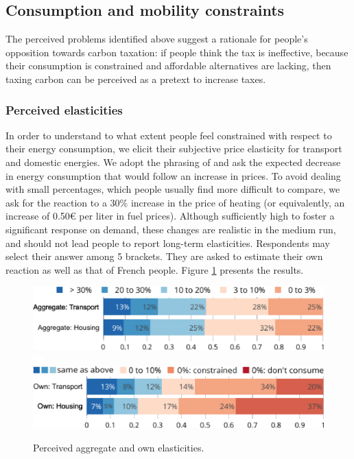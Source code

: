 \documentclass[english,5p,authoryear]{elsarticle}
\begin{document}
    \subsection{Consumption and mobility constraints}

The perceived problems identified above suggest a rationale for people's opposition towards carbon taxation: if people think the tax is ineffective, because their consumption is constrained and affordable alternatives are lacking, then taxing carbon can be perceived as a pretext to increase taxes. %

    \subsubsection{Perceived elasticities}

In order to understand to what extent people feel constrained with respect to their energy consumption, we elicit their subjective price elasticity for transport and domestic energies. We adopt the phrasing of \citet{baranzini_effectiveness_2017} and ask the expected decrease in energy consumption that would follow an increase in prices. To avoid dealing with small percentages, which people usually find more difficult to compare, we ask for the reaction to a 30\% increase in the price of heating (or equivalently, an increase of 0.50\euro{} per liter in fuel prices). Although sufficiently high to foster a significant response on demand, these changes are realistic in the medium run, and should not lead people to report long-term elasticities. Respondents may select their answer among 5 brackets. They are asked to estimate their own reaction as well as that of French people. Figure \ref{fig:elasticities_agg} presents the results.


\begin{figure}[t]
\centering
\includegraphics[width=\columnwidth]{Images_EPS/elasticities_agg_valb.eps}
\includegraphics[height=0.3cm]{Images_EPS/blank.eps}
\includegraphics[width=\columnwidth]{Images_EPS/elasticities_perso_valbuena.eps}
\caption{Perceived aggregate and own elasticities.}
\label{fig:elasticities_agg}
\end{figure}
\end{document}
